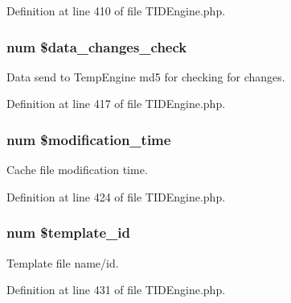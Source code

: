 Definition at line 410 of file TIDEngine.php.

\hypertarget{group__priv__settings_gade4bdb833871c0c762dd08d7ae627218}{
\subsubsection[{\$data\_\-changes\_\-check}]{\setlength{\rightskip}{0pt plus 5cm}num \$data\_\-changes\_\-check}}
\label{group__priv__settings_gade4bdb833871c0c762dd08d7ae627218}
Data send to TempEngine md5 for checking for changes. 

Definition at line 417 of file TIDEngine.php.

\hypertarget{group__priv__settings_ga1c507c75ecec577b312bb845ff0e5cc2}{
\subsubsection[{\$modification\_\-time}]{\setlength{\rightskip}{0pt plus 5cm}num \$modification\_\-time}}
\label{group__priv__settings_ga1c507c75ecec577b312bb845ff0e5cc2}
Cache file modification time. 

Definition at line 424 of file TIDEngine.php.

\hypertarget{group__priv__settings_ga88d4a982e092d52e64e05ee2b28f418f}{
\subsubsection[{\$template\_\-id}]{\setlength{\rightskip}{0pt plus 5cm}num \$template\_\-id}}
\label{group__priv__settings_ga88d4a982e092d52e64e05ee2b28f418f}
Template file name/id. 

Definition at line 431 of file TIDEngine.php.

